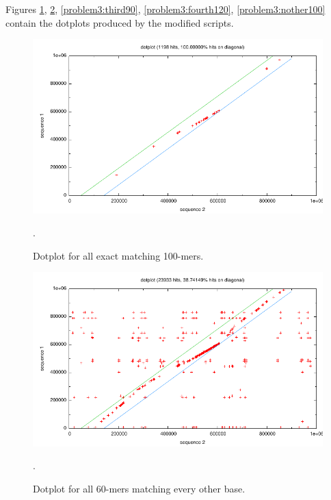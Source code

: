 Figures \ref{problem3:exact100}, \ref{problem3:other60},
\ref{problem3:third90}, \ref{problem3:fourth120}, \ref{problem3:nother100}
contain the dotplots produced by the modified scripts.

\begin{figure}[htb]
  \includegraphics[width=6.8in]{6.878/ps1/figs/p3_exact100.pdf}
  \caption{Dotplot for all exact matching 100-mers.}
  \label{problem3:exact100}.
\end{figure}

\begin{figure}[htb]
  \includegraphics[width=6.8in]{6.878/ps1/figs/p3_other60.pdf}
  \caption{Dotplot for all 60-mers matching every other base.}
  \label{problem3:other60}.
\end{figure}

